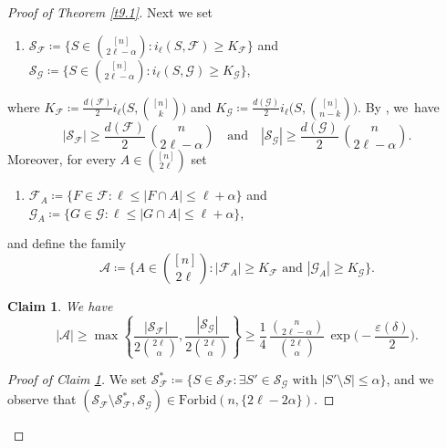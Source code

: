 \documentclass[10pt]{amsart}
\newtheorem{claim}[thm]{Claim}
\theoremstyle{remark}
\newcommand{\ee}{\varepsilon}
\newcommand{\meg}{\geqslant}
\newcommand{\mik}{\leqslant}
\newcommand{\Fcal}{\mathcal{F}}
\newcommand{\Gcal}{\mathcal{G}}
\newcommand{\Scal}{\mathcal{S}}
\newcommand{\Acal}{\mathcal{A}}
\begin{document}
\begin{proof}[Proof of Theorem \emph{\ref{t9.1}}]
Next we set
\begin{enumerate}
\item[$\bullet$] $\Scal_{\Fcal} \coloneqq \big\{ S\in\binom{[n]}{2\ell-\alpha}:
i_{\ell}(S,\Fcal)\meg K_{\Fcal}\big\}$ and
$\Scal_{\Gcal}\coloneqq \big\{ S\in\binom{[n]}{2\ell-\alpha}:
i_{\ell}(S,\Gcal)\meg K_{\Gcal}\big\}$,
\end{enumerate}
where $K_{\Fcal}\coloneqq \frac{d(\Fcal)}{2} i_{\ell}\big(S,\binom{[n]}{k}\big)$ and
$K_{\Gcal}\coloneqq \frac{d(\Gcal)}{2}i_{\ell}\big(S,\binom{[n]}{n-k}\big)$.
By \cite[Lemma 4.1]{FR87}, we~have
\begin{equation} \label{e9.7}
|\Scal_{\Fcal}| \meg \frac{d(\Fcal)}{2}\,\binom{n}{2\ell-\alpha}
\ \ \ \text{ and } \ \ \
|\Scal_{\Gcal}| \meg \frac{d(\Gcal)}{2}\, \binom{n}{2\ell-\alpha}.
\end{equation}
Moreover, for every $A\in\binom{[n]}{2\ell}$ set
\begin{enumerate}
\item[$\bullet$] $\Fcal_A\coloneqq \{F\in\Fcal:\ell\mik |F\cap A|\mik \ell+\alpha\}$
and $\Gcal_A\coloneqq \{G\in\Gcal:\ell\mik |G\cap A| \mik \ell+\alpha\}$,
\end{enumerate}
and define the family
\begin{equation} \label{e9.8}
\Acal\coloneqq \bigg\{A\in\binom{[n]}{2\ell}:
|\Fcal_A|\meg K_{\Fcal} \text{ and } |\Gcal_A| \meg K_{\Gcal}\bigg\}.
\end{equation}
\begin{claim} \label{c9.2}
We have
\begin{equation} \label{e9.9}
|\Acal| \meg \max\left\{ \frac{|\Scal_{\Fcal}|}{2\binom{2\ell}{\alpha}},
\frac{|\Scal_{\Gcal}|}{2\binom{2\ell}{\alpha}}\right\} \meg \frac{1}{4}\,
\frac{\binom{n}{2\ell-\alpha}}{\binom{2\ell}{\alpha}}\, \exp\Big(-\frac{\ee(\delta)}{2}\Big).
\end{equation}
\end{claim}
\begin{proof}[Proof of Claim \emph{\ref{c9.2}}]
We set $\Scal^*_{\Fcal}\coloneqq \{S\in\Scal_{\Fcal}:\exists S'\in\Scal_{\Gcal} \text{ with }
|S'\setminus S|\mik \alpha\}$, and we observe that
$(\Scal_{\Fcal}\setminus \Scal^*_{\Fcal},\Scal_{\Gcal})\in\mathrm{Forbid}(n,\{2\ell-2\alpha\})$.

\end{proof}
\end{proof}
\end{document}
